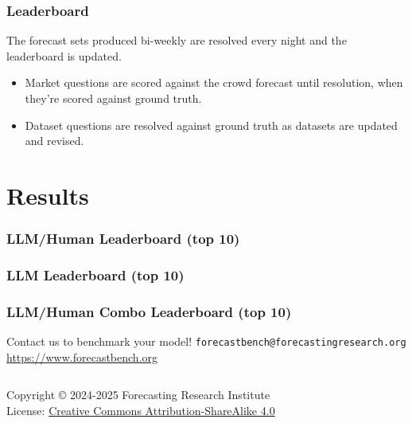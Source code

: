 \documentclass[aspectratio=169]{beamer}
\begin{document}
\begin{frame}
  \frametitle{Leaderboard}
  The forecast sets produced bi-weekly are resolved every night and the leaderboard is updated.
  \begin{itemize}
  \item Market questions are scored against the crowd forecast until resolution, when they're scored against ground truth.
  \item Dataset questions are resolved against ground truth as datasets are updated and revised.
  \end{itemize}

\end{frame}


\section{Results}


\begin{frame}[fragile=singleslide]
  \frametitle{LLM/Human Leaderboard (top 10)}
  
\end{frame}


\begin{frame}[fragile=singleslide]
  \frametitle{LLM Leaderboard (top 10)}
  
\end{frame}


\begin{frame}[fragile=singleslide]
  \frametitle{LLM/Human Combo Leaderboard (top 10)}
  
\end{frame}


\begin{frame}
  \begin{center}
    \vfill
    {\LARGE Contact us to benchmark your model!}
    \vfill
    {\LARGE \texttt{forecastbench@forecastingresearch.org}}
    \vfill
    {\LARGE \href{https://www.forecastbench.org/}{https://www.forecastbench.org}}
    \vfill
  \end{center}
  \vfill
  \begin{columns}[T]

    \ccbysa
    \tiny
    Copyright © 2024-2025 Forecasting Research Institute \\
    License: \href{http://creativecommons.org/licenses/by-sa/4.0/}{Creative
      Commons Attribution-ShareAlike 4.0}
  \end{columns}
\end{frame}
\end{document}
